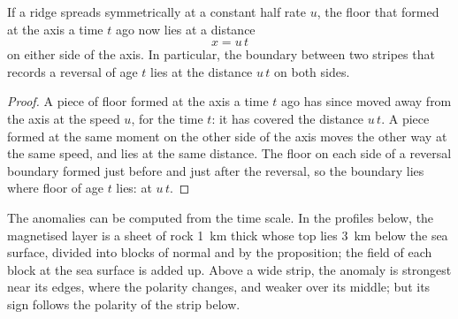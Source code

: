 \begin{proposition}\label{prop:g11:drift-to-spreading:stripe}
If a ridge spreads symmetrically at a constant half rate $u$, the floor that
formed at the axis a time $t$ ago now lies at a distance
\[
  x = u\,t
\]
on either side of the axis. In particular, the boundary between two stripes
that records a reversal of age $t$ lies at the distance $u\,t$ on both sides.
\end{proposition}

\begin{proof}
A piece of floor formed at the axis a time $t$ ago has since moved away from
the axis at the speed $u$, for the time $t$: it has covered the distance
$u\,t$. A piece formed at the same moment on the other side of the axis moves
the other way at the same speed, and lies at the same distance. The floor on
each side of a reversal boundary formed just before and just after the reversal,
so the boundary lies where floor of age $t$ lies: at $u\,t$.
\end{proof}

The anomalies can be computed from the time scale. In the profiles below, the
magnetised layer is a sheet of rock \qty{1}{km} thick whose top lies
\qty{3}{km} below the sea surface, divided into blocks of normal and  by the proposition; the field of each block at the sea surface is
added up. Above a wide strip, the anomaly is strongest near its edges, where
the polarity changes, and weaker over its middle; but its sign follows the
polarity of the strip below.

